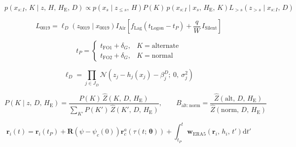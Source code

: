 \begin{equation}
  p\left(x_{s:I},\, K \mid z,\, H,\, H_{\mathrm{E}},\, D\right) \propto p\left(x_{s} \mid z_{\le s},\, H\right) P(K)\, p\left(x_{s:I} \mid x_{s},\, H_{\mathrm{E}},\, K\right) L_{>s}\left(z_{>s} \mid x_{s:I},\, D\right)
  \label{eq:12}
\end{equation}

\begin{equation}
  L_{0019} = \ell_{D}\left(z_{0019} \mid x_{0019}\right) I_{\mathrm{Air}} \left[ f_{\mathrm{Lag}}\left(t_{\mathrm{Logon}} - t_{P}\right) + \frac{q}{W}\, I_{\mathrm{Silent}} \right]
  \label{eq:13}
\end{equation}

\begin{equation}
  t_{P} = \begin{cases} t_{\mathrm{FO1}} + \delta_{G}, & K = \text{alternate} \\ t_{\mathrm{FO2}} + \delta_{G}, & K = \text{normal} \end{cases}
  \label{eq:14}
\end{equation}

\begin{equation}
  \ell_{D} = \prod_{j \in J_{D}} \mathcal{N}\left(z_{j} - h_{j}\left(x_{j}\right) - \beta_{j}^{D};\ 0,\ \sigma_{j}^{2}\right)
  \label{eq:15}
\end{equation}

\begin{equation}
  P\left(K \mid z,\, D,\, H_{\mathrm{E}}\right) = \frac{P(K)\, \hat{Z}\left(K,\, D,\, H_{\mathrm{E}}\right)}{\sum_{K'} P(K')\, \hat{Z}\left(K',\, D,\, H_{\mathrm{E}}\right)}, \qquad B_{\mathrm{alt:norm}} = \frac{\hat{Z}\left(\mathrm{alt},\, D,\, H_{\mathrm{E}}\right)}{\hat{Z}\left(\mathrm{norm},\, D,\, H_{\mathrm{E}}\right)}
  \label{eq:16}
\end{equation}

\begin{equation}
  \mathbf{r}_{i}(t) = \mathbf{r}_{i}\left(t_{P}\right) + \mathbf{R}\left(\psi - \psi_{c}(0)\right) \mathbf{r}_{c}^{a}\left(\tau\left(t;\, \boldsymbol{\theta}\right)\right) + \int_{t_{P}}^{t} \mathbf{w}_{\mathrm{ERA5}}\left(\mathbf{r}_{i},\, h_{i},\, t'\right) \mathrm{d}t'
  \label{eq:17}
\end{equation}

